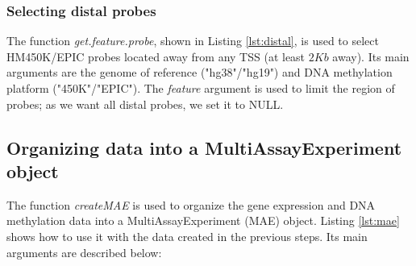 \subsubsection*{Selecting distal probes}

The function \textit{get.feature.probe}, shown in Listing \ref{lst:distal},
is used to select HM450K/EPIC probes located away from any TSS (at least $2Kb$ away).
Its main arguments are the genome of reference ("hg38"/"hg19") and DNA methylation
platform ("450K"/"EPIC"). The \textit{feature} argument is used to limit the region of probes; as we want all distal probes, we set it to NULL.



\subsection*{Organizing data into a MultiAssayExperiment object}
The function \textit{createMAE} is used to organize the gene expression and
 DNA methylation data into a MultiAssayExperiment (MAE) object. Listing \ref{lst:mae}
 shows how to use it with the data created in the previous steps.
  Its main arguments are described below:

